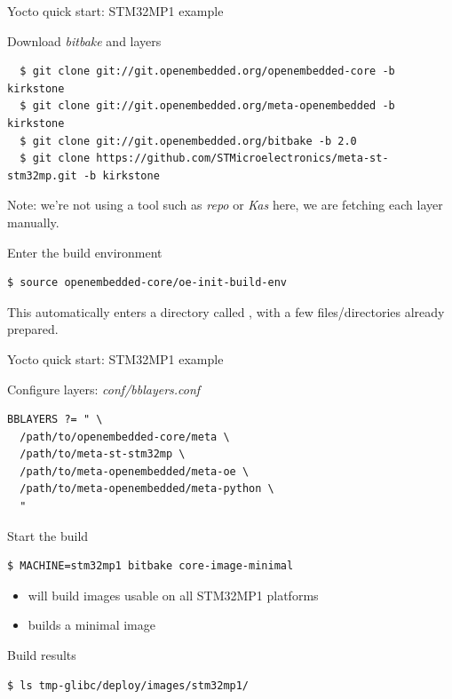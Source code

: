 \begin{frame}[fragile]{Yocto quick start: STM32MP1 example}
  \begin{block}{Download {\em bitbake} and layers}
    {\tiny
\begin{verbatim}
  $ git clone git://git.openembedded.org/openembedded-core -b kirkstone
  $ git clone git://git.openembedded.org/meta-openembedded -b kirkstone
  $ git clone git://git.openembedded.org/bitbake -b 2.0
  $ git clone https://github.com/STMicroelectronics/meta-st-stm32mp.git -b kirkstone
\end{verbatim}
    }
  \end{block}

  Note: we're not using a tool such as {\em repo} or {\em Kas} here,
  we are fetching each layer manually.

  \begin{block}{Enter the build environment}
    {\tiny
\begin{verbatim}
$ source openembedded-core/oe-init-build-env
\end{verbatim}
    }
  \end{block}

  This automatically enters a directory called , with a
  few files/directories already prepared.
\end{frame}

\begin{frame}[fragile]{Yocto quick start: STM32MP1 example}
  \begin{block}{Configure layers: {\em conf/bblayers.conf}}
    {\tiny
\begin{verbatim}
BBLAYERS ?= " \
  /path/to/openembedded-core/meta \
  /path/to/meta-st-stm32mp \
  /path/to/meta-openembedded/meta-oe \
  /path/to/meta-openembedded/meta-python \
  "
\end{verbatim}
    }
  \end{block}

  \begin{block}{Start the build}
    {\tiny
\begin{verbatim}
$ MACHINE=stm32mp1 bitbake core-image-minimal
\end{verbatim}
    }
  \end{block}

  \begin{itemize}
  \item {} will build images usable on all
    STM32MP1 platforms
  \item {} builds a minimal image
  \end{itemize}

  \begin{block}{Build results}
    {\tiny
\begin{verbatim}
$ ls tmp-glibc/deploy/images/stm32mp1/

\end{verbatim}
    }
  \end{block}
\end{frame}

